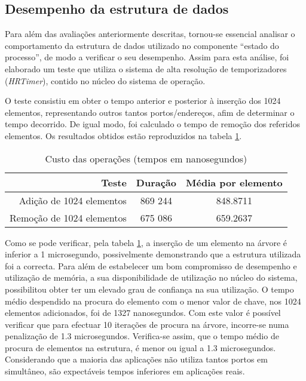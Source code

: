 \subsection{Desempenho da estrutura de dados}

Para além das avaliações anteriormente descritas, tornou-se essencial analisar o comportamento da estrutura de dados utilizado no componente “estado do processo”, de modo a verificar o seu desempenho.
Assim para esta análise, foi elaborado um teste que utiliza o sistema de alta resolução de temporizadores (\textit{HRTimer})\cite{hrtimerKernel}, contido no núcleo do sistema de operação.

O teste consistiu em obter o tempo anterior e posterior à inserção dos 1024 elementos, representando outros tantos portos/endereços, afim de determinar o tempo decorrido.
De igual modo, foi calculado o tempo de remoção dos referidos elementos. Os resultados obtidos estão reproduzidos na tabela \ref{tab:tree_info}.

\begin{table}[!htb]
\begin{center}
\caption{Custo das operações (tempos em nanosegundos)}
\begin{tabular}{ | r | c | c | }
\hline
\hspace{1cm} Teste \hspace{1.5cm} & \hspace{1cm}Duração\hspace{1cm} &  Média por
elemento \\
\hline
Adição de 1024 elementos & 869 244 & 848.8711 \\
\hline
Remoção de 1024 elementos & 675 086 & 659.2637\\
\hline

\hline
\end{tabular}
\label{tab:tree_info}
\end{center}
\end{table}

Como se pode verificar, pela tabela \ref{tab:tree_info}, a inserção de um elemento na árvore é inferior a 1 microsegundo, possivelmente demonstrando que a estrutura utilizada foi a correcta.
Para além de estabelecer um bom compromisso de desempenho e utilização de memória, a sua disponibilidade de utilização no núcleo do sistema, possibilitou obter ter um elevado grau de confiança na sua utilização.
O tempo médio despendido na procura do elemento com o menor valor de chave, nos 1024 elementos adicionados, foi de 1327 nanosegundos.
Com este valor é possível verificar que para efectuar 10 iterações de procura na árvore, incorre-se numa penalização de 1.3 microsegundos.
Verifica-se assim, que o tempo médio de procura de elementos na estrutura, é menor ou igual a 1.3 microsegundos.
Considerando que a maioria das aplicações não utiliza tantos portos em simultâneo, são expectáveis tempos inferiores em aplicações reais.


